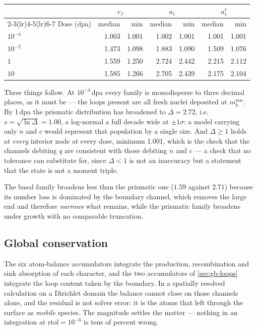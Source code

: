 \begin{center}
\begin{tabular}{@{}lrrrrrr@{}}
\toprule
& \multicolumn{2}{c}{$c_f$} & \multicolumn{2}{c}{$a_1$}
& \multicolumn{2}{c}{$a_1^{v}$} \\
\cmidrule(lr){2-3}\cmidrule(lr){4-5}\cmidrule(lr){6-7}
Dose (dpa) & median & min & median & min & median & min \\
\midrule
$10^{-4}$ & 1.003 & 1.001 & 1.002 & 1.001 & 1.001 & 1.001 \\
$10^{-2}$ & 1.473 & 1.098 & 1.883 & 1.090 & 1.509 & 1.076 \\
$1$       & 1.559 & 1.250 & 2.724 & 2.442 & 2.215 & 2.112 \\
$10$      & 1.585 & 1.266 & 2.705 & 2.439 & 2.175 & 2.104 \\
\bottomrule
\end{tabular}
\end{center}

Three things follow. At $10^{-4}\,$dpa every family is monodisperse to
three decimal places, as it must be --- the loops present are all fresh nuclei
deposited at $m^{\mathrm{nuc}}_k$. By 1\,dpa the prismatic distribution has
broadened to $\Delta=2.72$, i.e. $s=\sqrt{\ln\Delta}=1.00$, a log-normal a full
decade wide at $\pm1\sigma$: a model carrying only $n$ and $c$ would represent
that population by a single size. And $\Delta\ge1$ holds at \emph{every}
interior node at every dose, minimum 1.001, which is the check that the channels
debiting $q$ are consistent with those debiting $n$ and $c$ --- a check that no
tolerance can substitute for, since $\Delta<1$ is not an inaccuracy but a
statement that the state is not a moment triple.

The basal family broadens less than the prismatic one ($1.59$ against $2.71$)
because its number loss is dominated by the boundary channel, which removes the
large end and therefore \emph{narrows} what remains, while the prismatic family
broadens under growth with no comparable truncation.

\subsection{Global conservation}
\label{sec:results-conservation}

The six atom-balance accumulators integrate the production, recombination and
sink absorption of each character, and the two accumulators of
\cref{sec:gb-loops} integrate the loop content taken by the boundary. In a
spatially resolved calculation on a Dirichlet domain the balance cannot close on
those channels alone, and the residual is not solver error: it is the atoms that
left through the surface as \emph{mobile} species. The magnitude settles the
matter --- nothing in an integration at $\mathrm{rtol}=10^{-6}$ is tens of
percent wrong.

